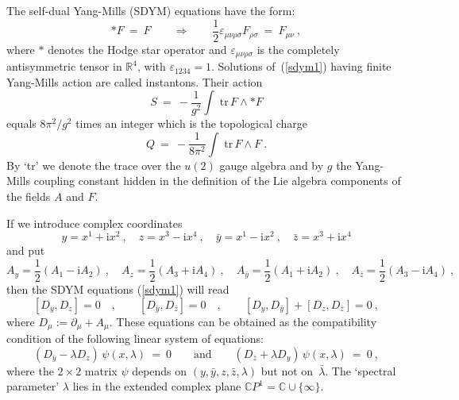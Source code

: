 \documentclass[a4paper,11pt]{article}
\numberwithin{equation}{section}
\def\ve{\varepsilon}
\def\l{\lambda}
\def\r{\rho}
\def\s{\sigma}
\newcommand{\C}{\mathbb C}
\newcommand{\R}{\mathbb R}
\def\i{\mbox{i}}
\def\pa{\mbox{$\partial$}}
\def\sfrac#1#2{{\textstyle\frac{#1}{#2}}}
\begin{document}
The self-dual Yang-Mills (SDYM) equations have the form:
\begin{equation}\label{sdym1}
*F\ =\ F \qquad\Longrightarrow\qquad
\sfrac{1}{2}\ve_{\mu\nu\r\s}F_{\r\s}\ =\ F_{\mu\nu}\ ,
\end{equation}
where $*$ denotes the Hodge star operator and
$\ve_{\mu\nu\r\s}$ is the completely antisymmetric tensor in 
$\R^4$, with $\ve_{1234}=1$. Solutions of~(\ref{sdym1}) having finite
Yang-Mills action are called instantons. 
Their action
\begin{equation}
S\ =\ -\frac{1}{g^2} \int\!\;\textrm{tr}\,F\wedge*F
\end{equation}
equals $8\pi^2/g^2$ times an integer which is the topological charge
\begin{equation}
Q\ =\ -\frac{1}{8\pi^2} \int\!\;\textrm{tr}\,F\wedge F \ .
\end{equation}
By `tr' we denote the trace over the $u(2)$ gauge algebra and 
by $g$ the Yang-Mills coupling constant hidden in the 
definition of the Lie algebra components of the fields $A$ and $F$.
  
If we introduce complex coordinates
\begin{equation} \label{coco}
y=x^1+\i x^2\  ,\quad z=x^3-\i x^4\ ,\quad 
\bar y=x^1-\i x^2\  ,\quad \bar z=x^3+\i x^4
\end{equation}
and put
\begin{equation}
A_y=\sfrac{1}{2}(A_1-\i A_2)\ ,\quad 
A_z=\sfrac{1}{2}(A_3+\i A_4)\ ,\quad 
A_{\bar y}=\sfrac{1}{2}(A_1+\i A_2)\ ,\quad
A_{\bar z}=\sfrac{1}{2}(A_3-\i A_4)\ ,
\end{equation}
then the SDYM equations (\ref{sdym1}) will read
\begin{equation}\label{sdym2} 
[D_y, D_z]=0\quad ,\qquad [D_{\bar y},D_{\bar z}]=0\quad ,\qquad 
[D_y, D_{\bar y}]+[D_z, D_{\bar z}]=0\ , 
\end{equation}
where $D_\mu :=\pa_\mu +A_\mu$.
These equations can be obtained as the compatibility condition 
of the following linear system of equations:
\begin{equation}\label{ls}
(D_{\bar y} - \l D_z )\,\psi (x,\l )\ =\ 0\qquad\mbox{and}\qquad
(D_{\bar z} + \l D_y )\,\psi (x,\l )\ =\ 0\ ,
\end{equation}
where the $2\times 2$ matrix $\psi$
depends on $(y, \bar y, z, \bar z, \l )$ but not on~$\bar\l$. 
The `spectral parameter'
$\l$ lies in the extended complex plane $\C P^1=\C\cup\{\infty\}$.
\end{document}
